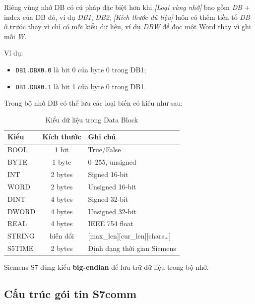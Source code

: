 \documentclass[../main.tex]{subfiles}
\begin{document}
Riêng vùng nhớ DB có cú pháp đặc biệt hơn khi \textit{[Loại vùng nhớ]} bao gồm \textit{DB} + index của DB đó, ví dụ \textit{DB1}, \textit{DB2}; \textit{[Kích thước dũ liệu]} luôn có thêm tiền tố \textit{DB} ở trước thay vì chỉ có mỗi kiểu dữ liệu, ví dụ \textit{DBW} để đọc một Word thay vì ghi mỗi \textit{W}.

Ví dụ: 

\begin{itemize}
    \item \texttt{DB1.DBX0.0} là bit 0 của byte 0 trong DB1;
    \item \texttt{DB1.DBX0.1} là bit 1 của byte 0 trong DB1.
\end{itemize}

Trong bộ nhớ DB có thể lưu các loại biến có kiểu như sau:

\begin{table}[H]
    \centering
    \caption{Kiểu dữ liệu trong Data Block}
    \label{tab:s7-db-types}
    \footnotesize
    \begin{tabular}{|l|c|l|}
        \hline
        \textbf{Kiểu} & \textbf{Kích thước} & \textbf{Ghi chú} \\
        \hline
        BOOL & 1 bit & True/False \\
        \hline
        BYTE & 1 byte & 0--255, unsigned \\
        \hline
        INT & 2 bytes & Signed 16-bit \\
        \hline
        WORD & 2 bytes & Unsigned 16-bit \\
        \hline
        DINT & 4 bytes & Signed 32-bit \\
        \hline
        DWORD & 4 bytes & Unsigned 32-bit \\
        \hline
        REAL & 4 bytes & IEEE 754 float \\
        \hline
        STRING & biến đổi & [max\_len][cur\_len][chars\ldots] \\
        \hline
        S5TIME & 2 bytes & Định dạng thời gian Siemens \\
        \hline
    \end{tabular}
\end{table}

Siemens S7 dùng kiểu \textbf{big-endian} để lưu trữ dữ liệu trong bộ nhớ.

\subsection{Cấu trúc gói tin S7comm}
\end{document}
